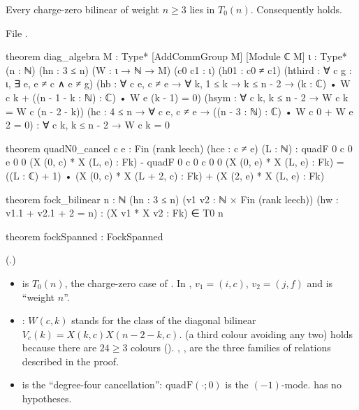 \begin{theorem}\label{ch12:thm:fock}
Every charge-zero bilinear of weight $n\ge3$ lies in $T_0(n)$.  Consequently  holds.
\end{theorem}
File .
\begin{leancode}
theorem diag_algebra {M : Type*} [AddCommGroup M] [Module ℂ M] {ι : Type*} (n : ℕ) (hn : 3 ≤ n)
    (W : ι → ℕ → M) (c0 c1 : ι) (h01 : c0 ≠ c1) (hthird : ∀ c g : ι, ∃ e, e ≠ c ∧ e ≠ g)
    (hb : ∀ c e, c ≠ e → ∀ k, 1 ≤ k → k ≤ n - 2 →
      (k : ℂ) • W c k + ((n - 1 - k : ℕ) : ℂ) • W e (k - 1) = 0)
    (hsym : ∀ c k, k ≤ n - 2 → W c k = W c (n - 2 - k))
    (hc : 4 ≤ n → ∀ c e, c ≠ e → ((n - 3 : ℕ) : ℂ) • W c 0 + W e 2 = 0) :
    ∀ c k, k ≤ n - 2 → W c k = 0

theorem quadN0_cancel {c e : Fin (rank leech)} (hce : c ≠ e) (L : ℕ) :
    quadF 0 c 0 e 0 0 (X (0, c) * X (L, e) : Fk) - quadF 0 c 0 c 0 0 (X (0, e) * X (L, e) : Fk)
      = ((L : ℂ) + 1) • (X (0, c) * X (L + 2, c) : Fk) + (X (2, e) * X (L, e) : Fk)

theorem fock_bilinear {n : ℕ} (hn : 3 ≤ n) (v1 v2 : ℕ × Fin (rank leech))
    (hw : v1.1 + v2.1 + 2 = n) : (X v1 * X v2 : Fk) ∈ T0 n

theorem fockSpanned : FockSpanned
\end{leancode}
(.)
\begin{dictionary}
\begin{itemize}
\item {} is $T_0(n)$, the charge-zero case of .  In , $v_1=(i,c)$,
  $v_2=(j,f)$ and  is ``weight $n$''.
\item {}: $W(c,k)$ stands for the class of the diagonal bilinear
  $V_c(k)=X(k,c)X(n-2-k,c)$.   (a third colour avoiding any two) holds because there are
  $24\ge3$ colours ().  , ,  are the three families of
  relations described in the proof.
\item {} is the ``degree-four cancellation'': $\mathrm{quadF}(\cdot;0)$ is the
  $(-1)$-mode.   has no hypotheses.
\end{itemize}
\end{dictionary}

